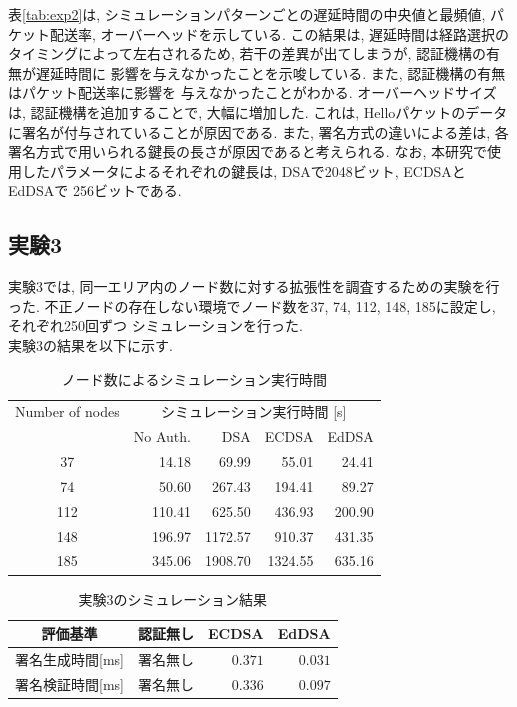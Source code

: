 \documentclass[a4j,9pt,twocolumn]{jsarticle}
\begin{document}
表\ref{tab:exp2}は, シミュレーションパターンごとの遅延時間の中央値と最頻値, 
パケット配送率, オーバーヘッドを示している. この結果は, 遅延時間は経路選択の
タイミングによって左右されるため, 若干の差異が出てしまうが, 認証機構の有無が遅延時間に
影響を与えなかったことを示唆している. また, 認証機構の有無はパケット配送率に影響を
与えなかったことがわかる. オーバーヘッドサイズは, 認証機構を追加することで,
大幅に増加した. これは, Helloパケットのデータに署名が付与されていることが原因である. 
また, 署名方式の違いによる差は, 各署名方式で用いられる鍵長の長さが原因であると考えられる. 
なお, 本研究で使用したパラメータによるそれぞれの鍵長は, DSAで2048ビット, ECDSAとEdDSAで
256ビットである. 

\subsection{実験3}
\indent 実験3では, 同一エリア内のノード数に対する拡張性を調査するための実験を行った. 
不正ノードの存在しない環境でノード数を37, 74, 112, 148, 185に設定し, それぞれ250回ずつ
シミュレーションを行った. \\
\indent 実験3の結果を以下に示す. 
\begin{table}[h]
    \centering
    \caption{ノード数によるシミュレーション実行時間}
    \label{tab:exp3_simtime}
    \begin{tabular}{c|rrrr} \hline
        Number of nodes & \multicolumn{4}{c}{シミュレーション実行時間 [s]} \\ \cline{2-5}
                       & No Auth. & DSA & ECDSA & EdDSA \\ \hline \hline
        37  &  14.18  &   69.99  &   55.01  &   24.41  \\
        74  &  50.60  &  267.43  &  194.41  &   89.27  \\
        112 & 110.41  &  625.50  &  436.93  &  200.90  \\
        148 & 196.97  & 1172.57  &  910.37  &  431.35  \\
        185 & 345.06  & 1908.70  & 1324.55  &  635.16  \\ \hline
    \end{tabular}
\end{table}
\vspace{-5mm}
\begin{table}[h]
    \centering
    \caption{実験3のシミュレーション結果}
    \label{tab:exp3_sig} 
    \begin{tabular}{c|crr} \hline
        評価基準 & 認証無し & ECDSA & EdDSA \\ \hline \hline
        署名生成時間[ms] & 署名無し & $0.371$ & $0.031$ \\
        署名検証時間[ms] & 署名無し & $0.336$ & $0.097$ \\ \hline
    \end{tabular}
\end{table}
\end{document}
